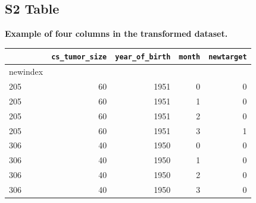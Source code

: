 \documentclass[10pt,letterpaper]{article}
\newcommand{\codewhite}[1]{\colorbox{white}{\texttt{#1}}}
\begin{document}
\subsection*{S2 Table}
\label{S2_Table}
{\bf Example of four columns in the transformed dataset.}
\begin{table}[H]
\begin{adjustwidth}{-2.25in}{0in} %
\begin{tabular}{lrrrr}
\toprule
{} &  \codewhite{cs\_tumor\_size} &  \codewhite{year\_of\_birth} &  \codewhite{month} &  \codewhite{newtarget} \\
\midrule
newindex &                &                &        &            \\
205      &             60 &           1951 &      0 &          0 \\
205      &             60 &           1951 &      1 &          0 \\
205      &             60 &           1951 &      2 &          0 \\
205      &             60 &           1951 &      3 &          1 \\
306      &             40 &           1950 &      0 &          0 \\
306      &             40 &           1950 &      1 &          0 \\
306      &             40 &           1950 &      2 &          0  \\
306      &             40 &           1950 &      3 &          0  \\
\bottomrule
\end{tabular}
\end{adjustwidth}
\end{table}
\end{document}
